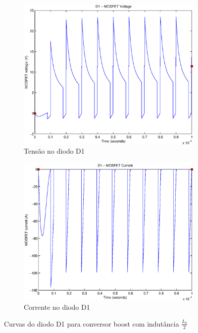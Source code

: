 \documentclass{article}
\begin{document}
\begin{figure}[H]
	\centering
	\begin{subfigure}[b]{0.4\linewidth}
		\includegraphics[width=\linewidth]{matlab/boost/r_d1v2}
		\caption{Tensão no diodo D1}
	\end{subfigure}
	\begin{subfigure}[b]{0.4\linewidth}
		\centering
		\includegraphics[width=\linewidth]{matlab/boost/r_d1i2}
		\caption{Corrente no diodo D1}
	\end{subfigure}
	\caption{Curvas do diodo D1 para conversor boost com indutância $\frac{L_b}{2}$}
	\label{fig:bod12}
\end{figure}
\end{document}
